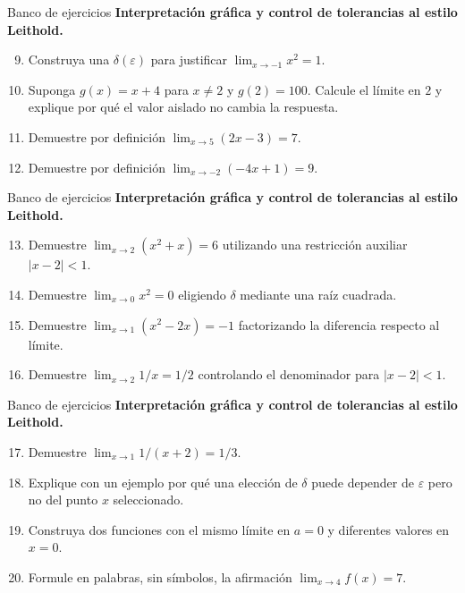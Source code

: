 \documentclass[12pt,aspectratio=169]{beamer}
\begin{document}
\begin{frame}[t,allowframebreaks]{Banco de ejercicios}
\small
\noindent \textbf{Interpretación gráfica y control de tolerancias al estilo Leithold.}\par\smallskip
\begin{enumerate}\setcounter{enumi}{8}
\item Construya una $\delta(\varepsilon)$ para justificar $\lim_{x\to-1}x^2=1$.
\item Suponga $g(x)=x+4$ para $x\ne2$ y $g(2)=100$. Calcule el límite en $2$ y explique por qué el valor aislado no cambia la respuesta.
\item Demuestre por definición $\lim_{x\to5}(2x-3)=7$.
\item Demuestre por definición $\lim_{x\to-2}(-4x+1)=9$.
\end{enumerate}
\end{frame}


\begin{frame}[t,allowframebreaks]{Banco de ejercicios}
\small
\noindent \textbf{Interpretación gráfica y control de tolerancias al estilo Leithold.}\par\smallskip
\begin{enumerate}\setcounter{enumi}{12}
\item Demuestre $\lim_{x\to2}(x^2+x)=6$ utilizando una restricción auxiliar $|x-2|<1$.
\item Demuestre $\lim_{x\to0}x^2=0$ eligiendo $\delta$ mediante una raíz cuadrada.
\item Demuestre $\lim_{x\to1}(x^2-2x)= -1$ factorizando la diferencia respecto al límite.
\item Demuestre $\lim_{x\to2}1/x=1/2$ controlando el denominador para $|x-2|<1$.
\end{enumerate}
\end{frame}


\begin{frame}[t,allowframebreaks]{Banco de ejercicios}
\small
\noindent \textbf{Interpretación gráfica y control de tolerancias al estilo Leithold.}\par\smallskip
\begin{enumerate}\setcounter{enumi}{16}
\item Demuestre $\lim_{x\to1}1/(x+2)=1/3$.
\item Explique con un ejemplo por qué una elección de $\delta$ puede depender de $\varepsilon$ pero no del punto $x$ seleccionado.
\item Construya dos funciones con el mismo límite en $a=0$ y diferentes valores en $x=0$.
\item Formule en palabras, sin símbolos, la afirmación $\lim_{x\to4}f(x)=7$.
\end{enumerate}
\end{frame}
\end{document}
